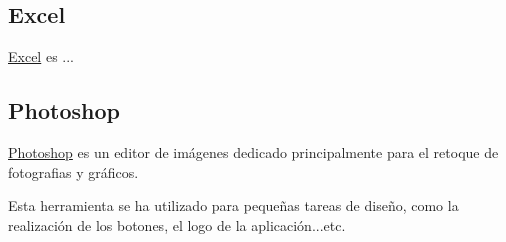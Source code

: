 \subsection{Excel}\label{excel}
\href{https://support.office.com/es-es/excel}{Excel} es ...

\subsection{Photoshop}\label{photoshop}
\href{https://www.photoshop.com/}{Photoshop} es un editor de imágenes dedicado principalmente para el retoque de fotografias y gráficos.

Esta herramienta se ha utilizado para pequeñas tareas de diseño, como la realización de los botones, el logo de la aplicación...etc.